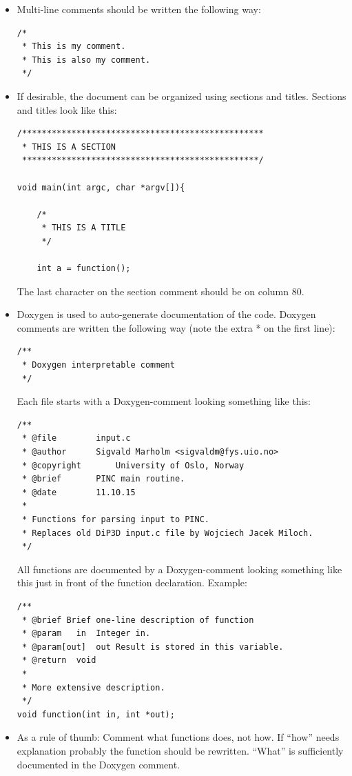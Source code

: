 \documentclass[10pt,a4paper]{article}
\begin{document}
\begin{itemize}
	\item Multi-line comments should be written the following way:
	\begin{lstlisting}
/*
 * This is my comment.
 * This is also my comment.
 */
	\end{lstlisting}
	\newpage
	\item If desirable, the document can be organized using sections and titles. Sections and titles look like this:
	\begin{lstlisting}
/*************************************************
 * THIS IS A SECTION
 ************************************************/

void main(int argc, char *argv[]){

	/*
	 * THIS IS A TITLE
	 */

	int a = function();

	\end{lstlisting}
	The last character on the section comment should be on column 80.
	
	
	 \item Doxygen is used to auto-generate documentation of the code. Doxygen comments are written the following way (note the extra * on the first line):
	 \begin{lstlisting}
/**
 * Doxygen interpretable comment
 */
	 \end{lstlisting}
	 Each file starts with a Doxygen-comment looking something like this:
	 \begin{lstlisting}
/**
 * @file		input.c
 * @author		Sigvald Marholm <sigvaldm@fys.uio.no>
 * @copyright		University of Oslo, Norway
 * @brief		PINC main routine.
 * @date		11.10.15
 *
 * Functions for parsing input to PINC.
 * Replaces old DiP3D input.c file by Wojciech Jacek Miloch.
 */	 	
	 \end{lstlisting}
	 All functions are documented by a Doxygen-comment looking something like this just in front of the function declaration. Example: 
	 \begin{lstlisting}
/**
 * @brief Brief one-line description of function
 * @param	in	Integer in.
 * @param[out]	out	Result is stored in this variable.
 * @return	void
 *
 * More extensive description.
 */
void function(int in, int *out);
	\end{lstlisting}
	\item As a rule of thumb: Comment what functions does, not how. If ``how'' needs explanation probably the function should be rewritten. ``What'' is sufficiently documented in the Doxygen comment.
\end{itemize}
\end{document}
